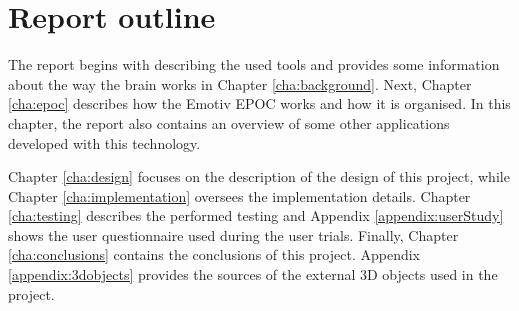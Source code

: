\section{Report outline}

The report begins with describing the used tools and provides some information about the way the brain works in Chapter \ref{cha:background}. Next, Chapter \ref{cha:epoc} describes how the Emotiv EPOC works and how it is organised. In this chapter, the report also contains an overview of some other applications developed with this technology.

Chapter \ref{cha:design} focuses on the description of the design of this project, while Chapter \ref{cha:implementation} oversees the implementation details. Chapter \ref{cha:testing} describes the performed testing and Appendix \ref{appendix:userStudy} shows the user questionnaire used during the user trials. Finally, Chapter \ref{cha:conclusions} contains the conclusions of this project. Appendix \ref{appendix:3dobjects} provides the sources of the external 3D objects used in the project.